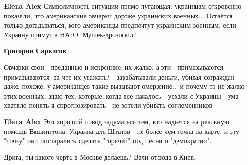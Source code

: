 \begin{itemize}
\begin{itemize}
 
\textbf{Elena Alex} Символичность ситуации прямо пугающая: украинцам откровенно
показали, что американские овчарки дороже украинских военных... Остаётся только
догадываться, кого американцы предпочтут украинским военным, если Украину
примут в НАТО. Мушек-дрозофил?

 
\textbf{Григорий Саркисов} 

Овчарки свои - преданные и искренние, их жалко, а
эти - примазываются-примазываются- за что их уважать? - зарабатывали деньги,
убивая сограждан - даже, похоже, у американцев такие вызывают омерзение... и
почему-то не жалко этих военных, знаю тех, которые, когда все началось - уехали
с Украины - ума хватило понять и спрогнозировать - не хотели убивать
соплеменников.

 
\textbf{Elena Alex} Это хороший повод задуматься тем, кто надеется на реальную помощь Вашингтона. Украина для Штатов - не более чем точка на карте, и эту "точку" они постарались сделать "горячей" под песни о "демократии".

 
Дрига, ты какого черта в Москве делаешь? Вали отсюда в Киев.

\end{itemize}

 

\end{itemize}
